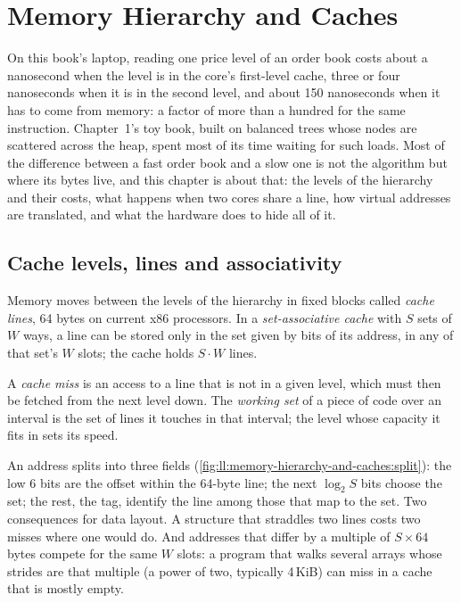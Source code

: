 \chapter{Memory Hierarchy and Caches}\label{ch:ll:memory-hierarchy-and-caches}

On this book's laptop, reading one price level of an order book costs about a nanosecond when the level is in the
core's first-level cache, three or four nanoseconds when it is in the second level, and about 150 nanoseconds when it
has to come from memory: a factor of more than a hundred for the same instruction. Chapter~1's toy book, built on balanced trees
whose nodes are scattered across the heap, spent most of its time waiting for such loads. Most of the difference
between a fast order book and a slow one is not the algorithm but where its bytes live, and this chapter is about that:
the levels of the hierarchy and their costs, what happens when two cores share a line, how virtual addresses are
translated, and what the hardware does to hide all of it.

\section{Cache levels, lines and associativity}

\begin{definition}\label{def:ll:memory-hierarchy-and-caches:line}
Memory moves between the levels of the hierarchy in fixed blocks called \emph{cache lines}, 64 bytes
on current x86 processors. In a \emph{set-associative cache} with $S$ sets of $W$ ways, a
line can be stored only in the set given by bits of its address, in any of that set's $W$ slots; the cache holds
$S \cdot W$ lines.
\end{definition}

\begin{definition}\label{def:ll:memory-hierarchy-and-caches:miss}
A \emph{cache miss} is an access to a line that is not in a given level, which must then be fetched
from the next level down. The \emph{working set} of a piece of code over an interval is the set of
lines it touches in that interval; the level whose capacity it fits in sets its speed.
\end{definition}

An address splits into three fields (\cref{fig:ll:memory-hierarchy-and-caches:split}): the low 6 bits are the offset
within the 64-byte line; the next $\log_2 S$ bits choose the set; the rest, the tag, identify the line among those that
map to the set. Two consequences for data layout. A structure that straddles two lines costs two misses where one would
do. And addresses that differ by a multiple of $S \times 64$ bytes compete for the same $W$ slots: a program that walks
several arrays whose strides are that multiple (a power of two, typically 4\,KiB) can miss in a cache that is mostly
empty.

